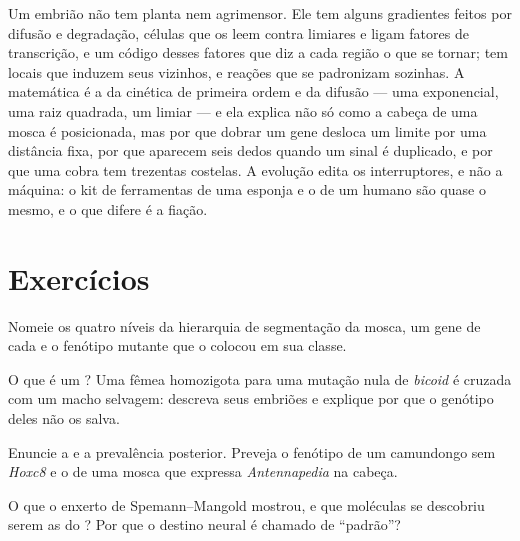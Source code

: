 \begin{remark}\label{rem:b3:developmental-genetics:remark}
Um embrião não tem planta nem agrimensor. Ele tem alguns gradientes
feitos por difusão e degradação, células que os leem contra limiares e
ligam fatores de transcrição, e um código desses fatores que diz a cada
região o que se tornar; tem  locais que induzem seus
vizinhos, e reações que se padronizam sozinhas. A matemática é a da
cinética de primeira ordem e da difusão --- uma exponencial, uma raiz
quadrada, um limiar --- e ela explica não só como a cabeça de uma mosca é
posicionada, mas por que dobrar um gene desloca um limite por uma
distância fixa, por que aparecem seis dedos quando um sinal é duplicado,
e por que uma cobra tem trezentas costelas. A evolução edita os
interruptores, e não a máquina: o kit de ferramentas de uma esponja e o
de um humano são quase o mesmo, e o que difere é a fiação.
\end{remark}

\section{Exercícios}

\begin{exercise}[$\star$]\label{exo:b3:developmental-genetics:1}
Nomeie os quatro níveis da hierarquia de segmentação da mosca, um gene
de cada e o fenótipo mutante que o colocou em sua classe.
\end{exercise}

\begin{exercise}[$\star$]\label{exo:b3:developmental-genetics:2}
O que é um ? Uma fêmea homozigota para uma mutação
nula de \emph{bicoid} é cruzada com um macho selvagem: descreva seus
embriões e explique por que o genótipo deles não os salva.
\end{exercise}

\begin{exercise}[$\star$]\label{exo:b3:developmental-genetics:3}
Enuncie a  e a prevalência posterior. Preveja o fenótipo de
um camundongo sem \emph{Hoxc8} e o de uma mosca que expressa
\emph{Antennapedia} na cabeça.
\end{exercise}

\begin{exercise}[$\star$]\label{exo:b3:developmental-genetics:4}
O que o enxerto de Spemann--Mangold mostrou, e que moléculas se
descobriu serem as do ? Por que o destino neural é chamado
de ``padrão''?
\end{exercise}


